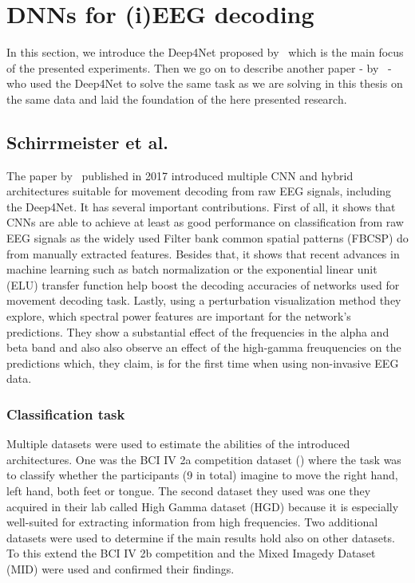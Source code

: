 \section{DNNs for (i)EEG decoding}
\label{sec:dnn-decoding}
In this section, we introduce the Deep4Net proposed by~\cite{schirrmeister-deep-2017} which is the main focus of the presented experiments.
Then we go on to describe another paper - by~\cite{Hammer-2021} - who used the Deep4Net to solve the same task as we are solving in this thesis on the same data and laid the foundation of the here presented research.

\subsection{Schirrmeister et al.}\label{subsec:schirrmeister-et-al}
The paper by~\cite{schirrmeister-deep-2017} published in 2017 introduced multiple CNN and hybrid architectures suitable for movement decoding from raw EEG signals, including the Deep4Net.
It has several important contributions.
First of all, it shows that CNNs are able to achieve at least as good performance on classification from raw EEG signals as the widely used Filter bank common spatial patterns (FBCSP) do from manually extracted features.
Besides that, it shows that recent advances in machine learning such as batch normalization or the exponential linear unit (ELU) transfer function help boost the decoding accuracies of networks used for movement decoding task.
Lastly, using a perturbation visualization method they explore, which spectral power features are important for the network's predictions.
They show a substantial effect of the frequencies in the alpha and beta band and also also observe an effect of the high-gamma freuquencies on the predictions which, they claim, is for the first time when using non-invasive EEG data.

\subsubsection{Classification task}
Multiple datasets were used to estimate the abilities of the introduced architectures.
One was the BCI IV 2a competition dataset (\cite{brunner2008bci}) where the task was to classify whether the participants (9 in total) imagine to move the right hand, left hand, both feet or tongue.
The second dataset they used was one they acquired in their lab called High Gamma dataset (HGD) because it is especially well-suited for extracting information from high frequencies.
Two additional datasets were used to determine if the main results hold also on other datasets. 
To this extend the BCI IV 2b competition and the Mixed Imagedy Dataset (MID) were used and confirmed their findings.


